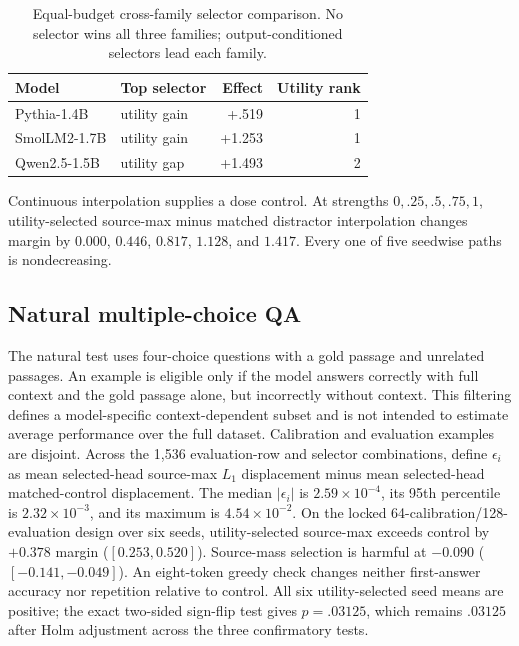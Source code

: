 \documentclass[letterpaper]{article} %
\begin{document}
\begin{table}[t]
\centering
\small
\setlength{\tabcolsep}{3.0pt}
\begin{tabular}{llrr}
\toprule
Model & Top selector & Effect & Utility rank \\
\midrule
Pythia-1.4B & utility gain & +.519 & 1 \\
SmolLM2-1.7B & utility gain & +1.253 & 1 \\
Qwen2.5-1.5B & utility gap & +1.493 & 2 \\
\bottomrule
\end{tabular}
\caption{Equal-budget cross-family selector comparison. No selector wins all three families; output-conditioned
selectors lead each family.}
\label{tab:supp-selector-family}
\end{table}

Continuous interpolation supplies a dose control. At strengths $0,.25,.5,.75,1$, utility-selected source-max
minus matched distractor interpolation changes margin by $0.000$, $0.446$, $0.817$, $1.128$, and $1.417$.
Every one of five seedwise paths is nondecreasing.

\subsection{Natural multiple-choice QA}

The natural test uses four-choice questions with a gold passage and unrelated passages. An example is
eligible only if the model answers correctly with full context and the gold passage alone, but incorrectly
without context. This filtering defines a model-specific context-dependent subset and is not intended to
estimate average performance over the full dataset. Calibration and evaluation examples are disjoint. Across
the 1,536 evaluation-row and selector combinations, define $\epsilon_i$ as mean selected-head source-max
$L_1$ displacement minus mean selected-head matched-control displacement. The median $|\epsilon_i|$ is
$2.59\times10^{-4}$, its 95th percentile is $2.32\times10^{-3}$, and its maximum is $4.54\times10^{-2}$.
On the locked
64-calibration/128-evaluation
design over six seeds, utility-selected source-max exceeds control by $+0.378$ margin
($[0.253,0.520]$). Source-mass selection is harmful at $-0.090$ ($[-0.141,-0.049]$). An eight-token greedy
check changes neither first-answer accuracy nor repetition relative to control. All six utility-selected seed
means are positive; the exact two-sided sign-flip test gives $p=.03125$, which remains $.03125$ after Holm
adjustment across the three confirmatory tests.
\end{document}
